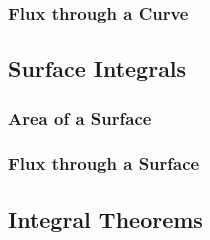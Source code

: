 \subsubsection{Flux through a Curve}

\subsection{Surface Integrals}
\subsubsection{Area of a Surface}
\subsubsection{Flux through a Surface}

\subsection{Integral Theorems}

